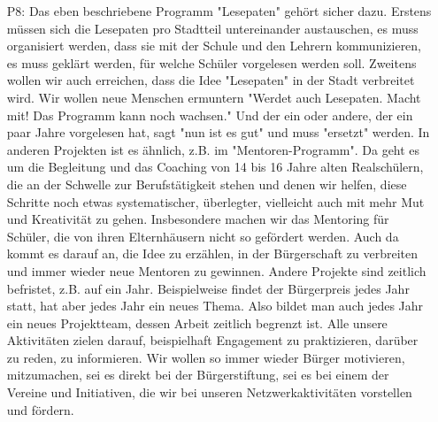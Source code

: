 \begin{itemize}
    \item[P8:] Das eben beschriebene Programm "Lesepaten" geh{\"o}rt sicher dazu. Erstens m{\"u}ssen sich die Lesepaten pro Stadtteil untereinander austauschen, es muss organisiert werden, dass sie mit der Schule und den Lehrern kommunizieren, es muss gekl{\"a}rt werden, f{\"u}r welche Sch{\"u}ler vorgelesen werden soll. Zweitens wollen wir auch erreichen, dass die Idee "Lesepaten" in der Stadt verbreitet wird. Wir wollen neue Menschen ermuntern "Werdet auch Lesepaten. Macht mit! Das Programm kann noch wachsen." Und der ein oder andere, der ein paar Jahre vorgelesen hat, sagt "nun ist es gut" und muss "ersetzt" werden. In  anderen Projekten ist es {\"a}hnlich, z.B. im "Mentoren-Programm". Da geht es um die Begleitung und das Coaching von 14 bis 16 Jahre alten Realsch{\"u}lern, die an der Schwelle zur Berufst{\"a}tigkeit stehen und denen wir helfen, diese Schritte noch etwas systematischer, {\"u}berlegter, vielleicht auch mit mehr Mut und Kreativit{\"a}t zu gehen. Insbesondere machen wir das Mentoring f{\"u}r Sch{\"u}ler, die von ihren Elternh{\"a}usern nicht so gef{\"o}rdert werden. Auch da kommt es darauf an, die Idee zu erz{\"a}hlen, in der B{\"u}rgerschaft zu verbreiten und immer wieder neue Mentoren zu gewinnen. Andere Projekte sind zeitlich befristet, z.B. auf ein Jahr. Beispielweise findet der B{\"u}rgerpreis jedes Jahr statt, hat aber jedes Jahr ein neues Thema. Also bildet man auch jedes Jahr ein neues Projektteam, dessen Arbeit zeitlich begrenzt ist. Alle unsere Aktivit{\"a}ten zielen darauf, beispielhaft Engagement zu praktizieren, dar{\"u}ber zu reden, zu informieren. Wir wollen so immer wieder B{\"u}rger motivieren, mitzumachen, sei es direkt bei der B{\"u}rgerstiftung, sei es bei einem der Vereine und Initiativen, die wir bei unseren Netzwerkaktivit{\"a}ten vorstellen und f{\"o}rdern.
\end{itemize}

